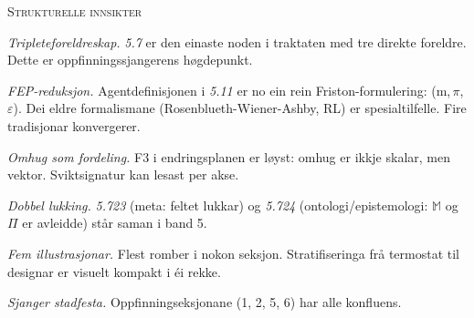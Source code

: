 \documentclass[a4paper,landscape,9pt]{article}
\begin{document}
\begin{minipage}[t]{0.325\textwidth}
{\scshape\small Strukturelle innsikter}

\emph{Tripleteforeldreskap.} \emph{5.7} er den einaste noden i traktaten med tre direkte foreldre. Dette er oppfinningssjangerens høgdepunkt.

\emph{FEP-reduksjon.} Agentdefinisjonen i \emph{5.11} er no ein rein Friston-formulering: (m,\,$\pi$,\,$\varepsilon$). Dei eldre formalismane (Rosenblueth-Wiener-Ashby, RL) er spesialtilfelle. Fire tradisjonar konvergerer.

\emph{Omhug som fordeling.} F3 i endringsplanen er løyst: omhug er ikkje skalar, men vektor. Sviktsignatur kan lesast per akse.

\emph{Dobbel lukking.} \emph{5.723} (meta: feltet lukkar) og \emph{5.724} (ontologi/epistemologi: $\mathbb{M}$ og $\Pi$ er avleidde) står saman i band 5.

\emph{Fem illustrasjonar.} Flest romber i nokon seksjon. Stratifiseringa frå termostat til designar er visuelt kompakt i éi rekke.

\emph{Sjanger stadfesta.} Oppfinningseksjonane (1, 2, 5, 6) har alle konfluens.
\end{minipage}
\end{document}
